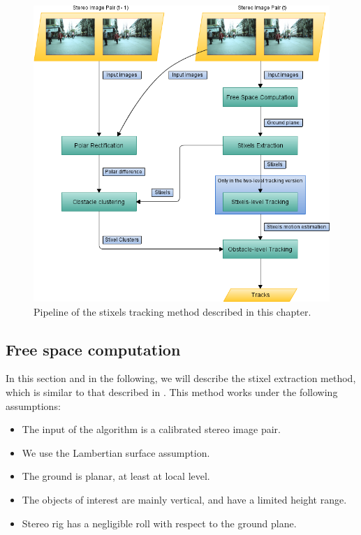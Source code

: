 \begin{figure}[h!]
  \centering
  \includegraphics{pipeline}
  \caption{Pipeline of the stixels tracking method described in this chapter.}\label{fig:cp04_pipeline}
\end{figure}

\subsection{Free space computation}\label{ch:chapter04_01_01}

In this section and in the following, we will describe the stixel extraction method, which is similar to that described in \cite{benenson2012pedestrian}. This method works under the following assumptions:

\begin{itemize}
 \item The input of the algorithm is a calibrated stereo image pair.
 \item We use the Lambertian surface assumption.
 \item The ground is planar, at least at local level.
 \item The objects of interest are mainly vertical, and have a limited height range.
 \item Stereo rig has a negligible roll with respect to the ground plane.
\end{itemize}

